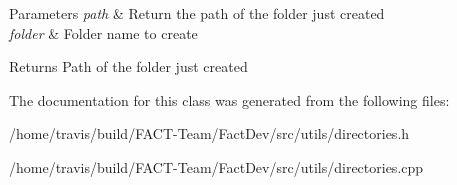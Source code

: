 \begin{DoxyParams}{Parameters}
{\em path} & Return the path of the folder just created \\
\hline
{\em folder} & Folder name to create \\
\hline
\end{DoxyParams}
\begin{DoxyReturn}{Returns}
Path of the folder just created 
\end{DoxyReturn}


The documentation for this class was generated from the following files\-:\begin{DoxyCompactItemize}
\item 
/home/travis/build/\-F\-A\-C\-T-\/\-Team/\-Fact\-Dev/src/utils/directories.\-h\item 
/home/travis/build/\-F\-A\-C\-T-\/\-Team/\-Fact\-Dev/src/utils/directories.\-cpp\end{DoxyCompactItemize}
